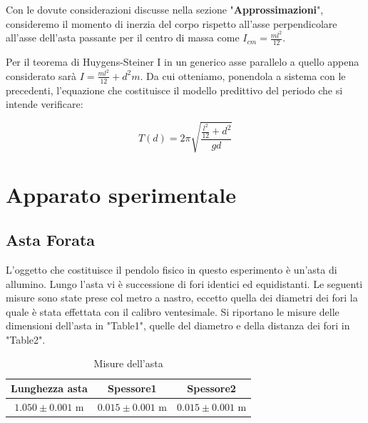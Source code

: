 \documentclass[11pt]{article}
\begin{document}
Con le dovute considerazioni discusse nella sezione "\textbf {Approssimazioni}", consideremo il momento di inerzia del corpo rispetto all'asse perpendicolare all'asse dell'asta passante per il centro di massa come $I_{cm}=\frac{ml^2}{12}$.

Per il teorema di Huygens-Steiner I in un generico asse parallelo a quello appena considerato sarà $I=\frac{ml^2}{12}+d^2m$.
Da cui otteniamo, ponendola a sistema con le precedenti, l'equazione che costituisce il modello predittivo del periodo che si intende verificare:

\begin{equation}
T(d)=2\pi\sqrt{\frac{\frac{l^2}{12}+d^2}{gd}}
\end{equation}

\section{Apparato sperimentale}
\subsection{Asta Forata}
L'oggetto che costituisce il pendolo fisico in questo esperimento è un'asta di allumino.
Lungo l'asta vi è successione di fori identici ed equidistanti.
Le seguenti misure sono state prese col metro a nastro, eccetto quella dei diametri dei fori la quale è  stata effettata con il calibro ventesimale.
Si riportano le misure delle dimensioni dell'asta in "Table1", quelle del diametro e della distanza dei fori in "Table2".
\begin{table}
\centering

\caption{Misure dell'asta}
\begin{tabular}[t]{|c|c|c|}
 Lunghezza asta &Spessore1&Spessore2\\
  \hline
  $1.050 \pm 0.001$ m & $0.015 \pm 0.001$ m & $0.015 \pm 0.001$ m \\
\end{tabular}

\end{table}
\end{document}

